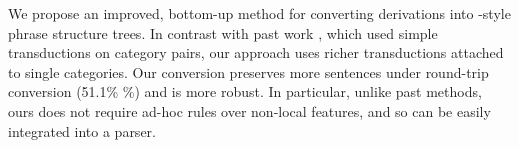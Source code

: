 
\newcommand{\old}{\candc{}-\textsc{conv}\xspace}

We propose an improved, bottom-up method for converting \ccg derivations into
\ptb-style phrase structure trees.  In contrast with past work
\parencite{Clark-Curran:2009}, which used simple transductions on category pairs,
our approach uses richer transductions attached to single categories.  Our
conversion preserves more sentences under round-trip conversion
(51.1\% \%)
and is more robust.  In particular, unlike past methods, ours does not
require ad-hoc rules over non-local features, and so can be easily
integrated into a parser.

